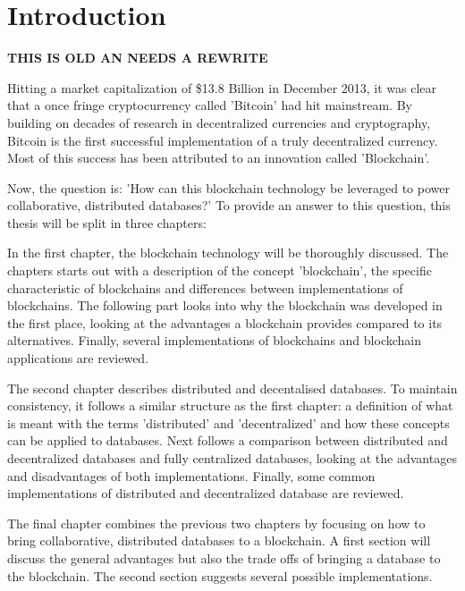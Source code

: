 \chapter{Introduction}

\textbf{THIS IS OLD AN NEEDS A REWRITE}


Hitting a market capitalization of \$13.8 Billion in December 2013, it was clear that a once fringe cryptocurrency called 'Bitcoin' had hit mainstream. By building on decades of research in decentralized currencies and cryptography, Bitcoin is the first successful implementation of a truly decentralized currency. Most of this success has been attributed to an innovation called 'Blockchain'.


Now, the question is: 'How can this blockchain technology be leveraged to power collaborative, distributed databases?' To provide an answer to this question, this thesis will be split in three chapters:


In the first chapter, the blockchain technology will be thoroughly discussed. The chapters starts out with a description of the concept 'blockchain', the specific characteristic of blockchains and differences between implementations of blockchains. The following part looks into why the blockchain was developed in the first place, looking at the advantages a blockchain provides compared to its alternatives. Finally, several implementations of blockchains and blockchain applications are reviewed.

The second chapter describes distributed and decentalised databases. To maintain consistency, it follows a similar structure as the first chapter: a definition of what is meant with the terms 'distributed' and 'decentralized' and how these concepts can be applied to databases. Next follows a comparison between distributed and decentralized databases and fully centralized databases, looking at the advantages and disadvantages of both implementations. Finally, some common implementations of distributed and decentralized database are reviewed.

The final chapter combines the previous two chapters by focusing on how to bring collaborative, distributed databases to a blockchain. A first section will discuss the general advantages but also the trade offs of bringing a database to the blockchain. The second section suggests several possible implementations.
